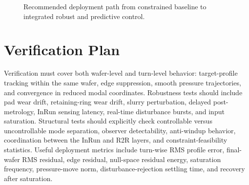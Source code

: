 \documentclass[11pt,a4paper]{article}
\begin{document}
\begin{figure}[h!]
\centering
{}
\caption{Recommended deployment path from constrained baseline to integrated robust and predictive control.}
\end{figure}

\section{Verification Plan}
Verification must cover both wafer-level and turn-level behavior: target-profile tracking within the same wafer, edge suppression, smooth pressure trajectories, and convergence in reduced modal coordinates. Robustness tests should include pad wear drift, retaining-ring wear drift, slurry perturbation, delayed post-metrology, InRun sensing latency, real-time disturbance bursts, and input saturation. Structural tests should explicitly check controllable versus uncontrollable mode separation, observer detectability, anti-windup behavior, coordination between the InRun and R2R layers, and constraint-feasibility statistics. Useful deployment metrics include turn-wise RMS profile error, final-wafer RMS residual, edge residual, null-space residual energy, saturation frequency, pressure-move norm, disturbance-rejection settling time, and recovery after saturation.
\end{document}

